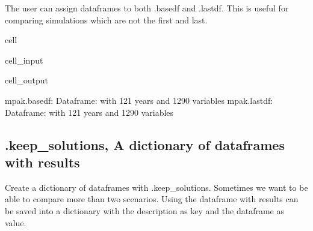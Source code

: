 \documentclass[letterpaper,10pt,english]{jupyterBook}
\begin{document}
\sphinxAtStartPar
The user can assign dataframes to both .basedf and .lastdf. This is useful for comparing simulations which are not the first and last.

\begin{sphinxuseclass}{cell}\begin{sphinxVerbatimInput}

\begin{sphinxuseclass}{cell_input}
\begin{sphinxVerbatim}[commandchars=\\\{\}]
\PYG{p}{[}\PYG{p}{]}\PYG{p}{[}\PYG{p}{]}
\PYG{p}{[}\PYG{p}{]}\PYG{p}{[}\PYG{p}{]}
\end{sphinxVerbatim}

\end{sphinxuseclass}\end{sphinxVerbatimInput}
\begin{sphinxVerbatimOutput}

\begin{sphinxuseclass}{cell_output}
\begin{sphinxVerbatim}[commandchars=\\\{\}]
mpak.basedf: Dataframe: with 121 years and 1290 variables
mpak.lastdf: Dataframe: with 121 years and 1290 variables
\end{sphinxVerbatim}

\end{sphinxuseclass}\end{sphinxVerbatimOutput}

\end{sphinxuseclass}

\subsection{.keep\_solutions, A dictionary of dataframes with results}
\label{\detokenize{content/notebooks/modelflow_features:keep-solutions-a-dictionary-of-dataframes-with-results}}
\sphinxAtStartPar
Create a dictionary of dataframes with .keep\_solutions. Sometimes we want to be able to compare more than two scenarios. Using  the dataframe with results can be saved into a dictionary with the description as key and the dataframe as value.
\end{document}
